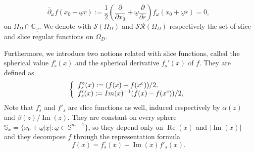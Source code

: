\documentclass{amsart}
\theoremstyle{definition}
\theoremstyle{remark}
\numberwithin{equation}{section}
\begin{document}
\begin{equation*}
    \overline{\partial}_{\underline{\omega}}f(x_{0}+\underline{\omega}r):=\frac{1}{2}\left(\frac{\partial}{\partial x_{0}}+\underline{\omega}\frac{\partial}{\partial r}\right)f_{\underline{\omega}}(x_{0}+\underline{\omega}r)=0,
\end{equation*}
on $\Omega_{D} \cap \mathbb{C}_{\underline{\omega}}$. We denote with $\mathcal{S}(\Omega_D)$ and $\mathcal{S}\mathcal{R}(\Omega_D)$ respectively the set of slice and slice regular functions on $\Omega_D$.


Furthermore, we introduce two notions related with slice functions, called the spherical value $f_{s}^{\circ}(x)$
and the  spherical derivative $f_{s}'(x)$ of $f$. They are defined as
\begin{equation} \label{qe1}
    \begin{split}
    			\left\{
    			\begin{array}{ll}
    		 f_{s}^{\circ}(x):=(f(x)+f(x^c))/2,\\
    				 f_{s}'(x):={\rm Im}(x)^{-1}(f(x)-f( x^c))/2,\\
    			\end{array}
    			\right.
    		\end{split}
\end{equation}
Note that $f^\circ_s$ and $f'_s$ are slice functions as well, induced respectively by $\alpha(z)$ and $\beta(z)/\operatorname{Im}(z)$. They are constant on every sphere $\mathbb{S}_x=\{x_0+\underline\omega|\underline x|:\underline\omega\in\mathbb{S}^{m-1}\}$, so they depend only on $\operatorname{Re}(x)$ and $|\operatorname{Im}(x)|$ and they decompose $f$ through the representation formula
\begin{equation*}
    f(x)=f^\circ_s(x)+\operatorname{Im}(x)f'_s(x).
\end{equation*}
\end{document}

